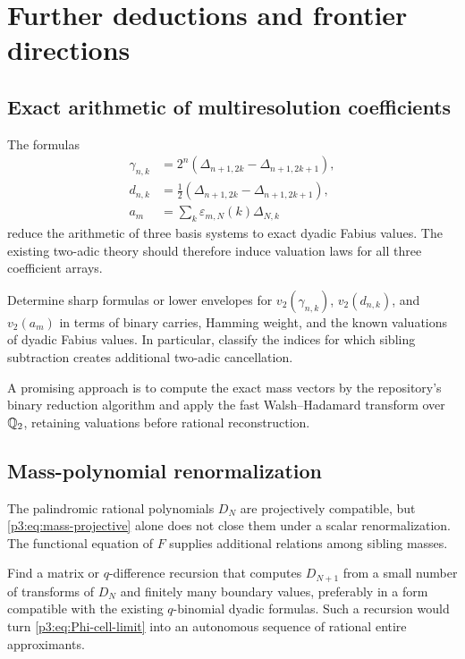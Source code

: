 \documentclass[11pt]{article}
\theoremstyle{definition}
\theoremstyle{remark}
\begin{document}
\section{Further deductions and frontier directions}
\label{p3:sec:frontiers}

\subsection{Exact arithmetic of multiresolution coefficients}

The formulas
\begin{align*}
 \gamma_{n,k}&=2^n(\Delta_{n+1,2k}-\Delta_{n+1,2k+1}),\\
 d_{n,k}&=\tfrac12(\Delta_{n+1,2k}-\Delta_{n+1,2k+1}),\\
 a_m&=\sum_k\varepsilon_{m,N}(k)\Delta_{N,k}
\end{align*}
reduce the arithmetic of three basis systems to exact dyadic Fabius values.
The existing two-adic theory should therefore induce valuation laws for all
three coefficient arrays.

\begin{openproblem}
\label{p3:op:two-adic-spectrum}
Determine sharp formulas or lower envelopes for
$v_2(\gamma_{n,k})$, $v_2(d_{n,k})$, and $v_2(a_m)$ in terms of binary carries,
Hamming weight, and the known valuations of dyadic Fabius values.  In
particular, classify the indices for which sibling subtraction creates
additional two-adic cancellation.
\end{openproblem}

A promising approach is to compute the exact mass vectors by the repository's
binary reduction algorithm and apply the fast Walsh--Hadamard transform over
$\mathbb Q_2$, retaining valuations before rational reconstruction.

\subsection{Mass-polynomial renormalization}

The palindromic rational polynomials $D_N$ are projectively compatible, but
\eqref{p3:eq:mass-projective} alone does not close them under a scalar
renormalization.  The functional equation of $F$ supplies additional relations
among sibling masses.

\begin{openproblem}
\label{p3:op:DN-recursion}
Find a matrix or $q$-difference recursion that computes $D_{N+1}$ from a small
number of transforms of $D_N$ and finitely many boundary values, preferably in
a form compatible with the existing $q$-binomial dyadic formulas.  Such a
recursion would turn \eqref{p3:eq:Phi-cell-limit} into an autonomous sequence of
rational entire approximants.
\end{openproblem}
\end{document}
